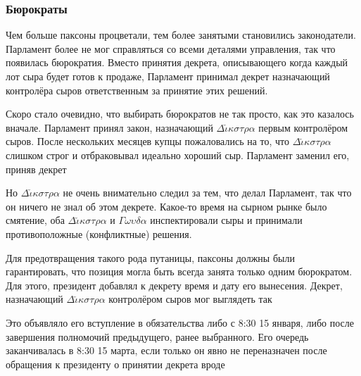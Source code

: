 \documentclass[12pt, a4paper]{article} %
\begin{document}
\subsubsection{Бюрократы}\label{sec:bureaucrats}

Чем больше паксоны процветали, тем более занятыми становились законодатели. Парламент более не мог справляться со всеми деталями управления, так что появилась бюрократия. Вместо принятия декрета, описывающего когда каждый лот сыра будет готов к продаже, Парламент принимал декрет назначающий контролёра сыров ответственным за принятие этих решений. 

Скоро стало очевидно, что выбирать бюрократов не так просто, как это казалось вначале. Парламент принял закон, назначающий $\Delta\check{\iota}\kappa\sigma\tau\rho\alpha$ первым контролёром сыров. После нескольких месяцев купцы пожаловались на то, что $\Delta\check{\iota}\kappa\sigma\tau\rho\alpha$ слишком строг и отбраковывал идеально хороший сыр. Парламент заменил его, приняв декрет


Но $\Delta\check{\iota}\kappa\sigma\tau\rho\alpha$ не очень внимательно следил за тем, что делал Парламент, так что он ничего не знал об этом декрете. Какое-то время на сырном рынке было смятение, оба $\Delta\check{\iota}\kappa\sigma\tau\rho\alpha$ и $\Gamma\omega\upsilon\delta\alpha$ инспектировали сыры и принимали противоположные (конфликтные) решения.

Для предотвращения такого рода путаницы, паксоны должны были гарантировать, что позиция могла быть всегда занята только одним бюрократом. Для этого, президент добавлял к декрету время и дату его вынесения. Декрет, назначающий $\Delta\check{\iota}\kappa\sigma\tau\rho\alpha$ контролёром сыров мог выглядеть так


Это объявляло его вступление в обязательства либо с 8:30 15 января, либо после завершения полномочий предыдущего, ранее выбранного. Его очередь заканчивалась в 8:30 15 марта, если только он явно не переназначен после обращения к президенту о принятии декрета вроде

\end{document}
